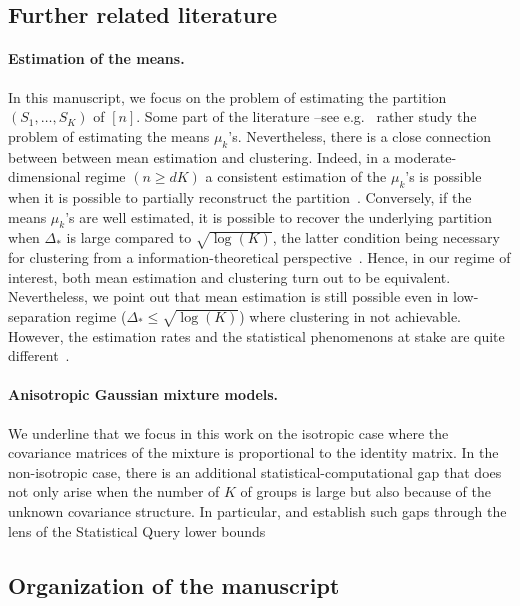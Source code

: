 \documentclass{article}
\begin{document}
\subsection{Further related literature}






\paragraph{Estimation of the means.} In this manuscript, we focus on the problem of estimating the partition $(S_1,\ldots, S_K)$ of $[n]$. Some part of the literature --see e.g.~\cite{Regev2017,diakonikolas2018list,LiuLi2022,Kwon20} rather study the problem of estimating the means $\mu_k$'s. Nevertheless, there is a close connection between between mean estimation and clustering. Indeed, in a moderate-dimensional regime $(n\geq dK)$ a consistent estimation of the $\mu_k$'s is possible when it is possible to partially reconstruct the partition~\cite{LiuLi2022}. Conversely, if the means $\mu_k$'s are well estimated, it is possible to recover the underlying partition when $\Delta_*$ is large compared to $\sqrt{\log(K)}$, the latter condition being necessary for clustering from a information-theoretical perspective~\cite{Even24}. Hence, in our regime of interest, both mean estimation and clustering turn out to be equivalent. Nevertheless, we point out that mean estimation is still possible even in low-separation regime ($\Delta_*\leq \sqrt{\log(K)}$) where clustering in not achievable. However, the estimation rates and the statistical phenomenons at stake are quite different~\cite{Regev2017,doss2020optimal}.


\paragraph{Anisotropic Gaussian mixture models.} We underline that we focus in this work on the isotropic case where the covariance matrices of the mixture is proportional to the identity matrix. In the non-isotropic case, there is an additional statistical-computational gap that does not only arise when the number of $K$ of groups is large but also because of the unknown covariance structure. In particular,  \cite{SQclustering} and \cite{pmlr-v195-diakonikolas23b}  establish such gaps through the lens of the Statistical Query lower bounds 





\subsection{Organization of the manuscript}
\end{document}
